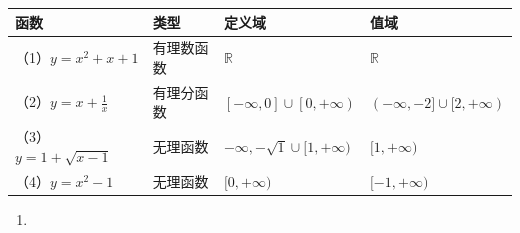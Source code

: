 {\def\LTcaptype{none} %
\begin{longtable}[]{@{}
  >{\raggedright\arraybackslash}p{}
  >{\raggedright\arraybackslash}p{}
  >{\raggedright\arraybackslash}p{}
  >{\raggedright\arraybackslash}p{}@{}}
\toprule\noalign{}
\begin{minipage}[b]{\linewidth}\raggedright
函数
\end{minipage} & \begin{minipage}[b]{\linewidth}\raggedright
类型
\end{minipage} & \begin{minipage}[b]{\linewidth}\raggedright
定义域
\end{minipage} & \begin{minipage}[b]{\linewidth}\raggedright
值域
\end{minipage} \\
\midrule\noalign{}
\endhead
\bottomrule\noalign{}
\endlastfoot
（1）\(y = x^{2} + x + 1\) & 有理数函数 & \(\mathbb{R}\) &
\(\mathbb{R}\) \\
（2）\(y = x + \frac{1}{x}\) & 有理分函数 &
\(\left[-\infty, 0\right] \cup \left[0, +\infty\right)\) &
\((-\infty, -2] \cup [2, +\infty)\) \\
（3）\(y = 1 + \sqrt{x - 1}\) & 无理函数 &
\(-\infty, -\sqrt{1} \cup [1, +\infty)\) & \([1, +\infty)\) \\
（4）\(y = x^{2} - 1\) & 无理函数 & \([0, +\infty)\) &
\([-1, +\infty)\) \\
\end{longtable}
}

\begin{enumerate}[start=5]
\item
\end{enumerate}

